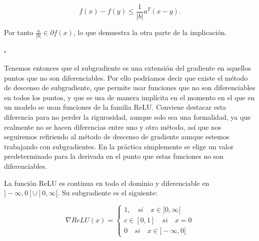 $$f(x) - f(y) \leq \frac{1}{|b|} a^T (x-y).$$

Por tanto $\frac{a}{|b|} \in \partial f(x)$, lo que demuestra la otra parte de la implicación.

\begin{flushright}
    $\square$
\end{flushright} 





Tenemos entonces que el subgradiente es una extensión del gradiente en aquellos puntos que no son diferenciables. Por ello podríamos decir que existe el método de descenso de subgradiente, que permite usar funciones que no son diferenciables en todos los puntos, y que se usa de manera implícita en el momento en el que en un modelo se usan funciones de la familia ReLU. Conviene destacar esta diferencia para no perder la rigurosidad, aunque solo sea una formalidad, ya que realmente no se hacen diferencias entre uno y otro método, así que nos seguiremos refiriendo al método de descenso de gradiente aunque estemos trabajando con subgradientes. En la práctica simplemente se elige un valor predeterminado para la derivada en el punto que estas funciones no son diferenciables.

\begin{ejemplo}\label{ej:RELUsub}
     La función ReLU es continua en todo el dominio y diferenciable en $]-\infty,0[ \cup ]0,\infty[$. Su subgradiente es el siguiente:

    $$ \nabla ReLU(x)=\left\{\begin{matrix}
1, \quad si \quad x \in ]0,\infty[ \\
c \in [0,1] \quad si \quad x=0\\
0 \quad si \quad x \in ]-\infty,0[
\end{matrix}\right.$$
\end{ejemplo}

